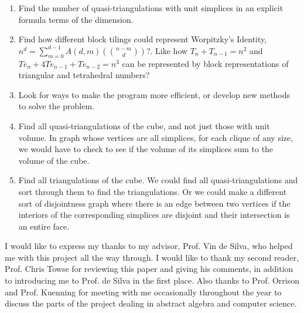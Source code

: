 \documentclass[12pt]{scrippsthesis}
\newcommand{\mchoose}[2]{{\textstyle \left( \! {#1 \choose #2} \! \right)}}
\theoremstyle{definition}
\theoremstyle{remark}
\theoremstyle{plain}
\begin{document}
\begin{enumerate}
\item Find the number of quasi-triangulations with unit simplices in an explicit formula terms of the dimension.
\item\label{squares} Find how different block tilings could represent Worpitzky's Identity, $n^d = \sum_{m=0}^{d-1} A(d,m) \mchoose{n-m}{d}$?. Like how $T_{n}+T_{n-1}=n^2$ and $Te_n+4Te_{n-1}+Te_{n-2}=n^3$ can be represented by block representations of triangular and tetrahedral numbers?
\item Look for ways to make the program more efficient, or develop new methods to solve the problem.
\item Find all quasi-triangulations of the cube, and not just those with unit volume.  In graph whose vertices are all simplices, for each clique of any size, we would have to check to see if the volume of its simplices sum to the volume of the cube.
\item Find all triangulations of the cube.  We could find all quasi-triangulations and sort through them to find the triangulations.  Or we could make a different sort of disjointness graph where there is an edge between two vertices if the interiors of the corresponding simplices are disjoint and their intersection is an entire face.
\end{enumerate}







\begin{acknowledgments}

I would like to express my thanks to my advisor, Prof. Vin de Silva, who helped me with this project all the way through.  I would like to thank my second reader, Prof. Chris Towse for reviewing this paper and giving his comments, in addition to introducing me to Prof. de Silva in the first place.  Also thanks to Prof. Orrison and Prof. Kuenning for meeting with me occasionally throughout the year to discuss the parts of the project dealing in abstract algebra and computer science.

\end{acknowledgments}
\end{document}
